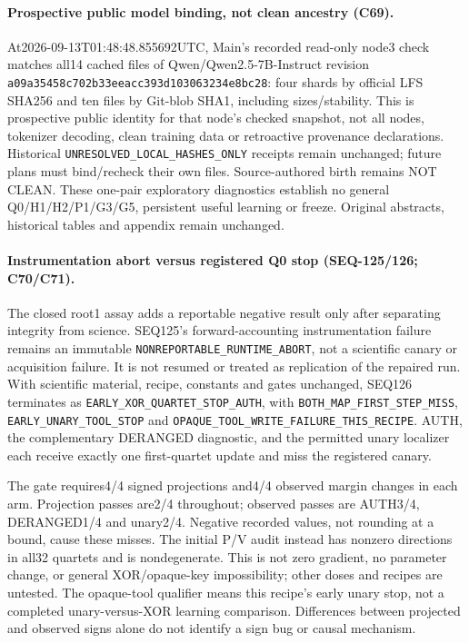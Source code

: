 \documentclass{article}
\begin{document}
\paragraph{Prospective public model binding, not clean ancestry (C69).}
At2026-09-13T01:48:48.855692UTC, Main's recorded read-only node3 check matches
all14 cached files of Qwen/Qwen2.5-7B-Instruct revision
\texttt{a09a35458c702b33eeacc393d103063234e8bc28}: four shards by official
LFS SHA256 and ten files by Git-blob SHA1, including sizes/stability. This is
prospective public identity for that node's checked snapshot, not all nodes,
tokenizer decoding, clean training data or retroactive provenance declarations.
Historical \texttt{UNRESOLVED\_LOCAL\_HASHES\_ONLY} receipts remain unchanged;
future plans must bind/recheck their own files. Source-authored birth remains
NOT CLEAN. These one-pair exploratory diagnostics establish no general
Q0/H1/H2/P1/G3/G5, persistent useful learning or freeze. Original abstracts,
historical tables and appendix remain unchanged.

\paragraph{Instrumentation abort versus registered Q0 stop (SEQ-125/126; C70/C71).}
The closed root1 assay adds a reportable negative result only after separating
integrity from science. SEQ125's forward-accounting instrumentation failure
remains an immutable \texttt{NONREPORTABLE\_RUNTIME\_ABORT}, not a scientific
canary or acquisition failure. It is not resumed or treated as replication of
the repaired run. With scientific material, recipe, constants and gates unchanged,
SEQ126 terminates as \texttt{EARLY\_XOR\_QUARTET\_STOP\_AUTH}, with
\texttt{BOTH\_MAP\_FIRST\_STEP\_MISS},
\texttt{EARLY\_UNARY\_TOOL\_STOP} and
\texttt{OPAQUE\_TOOL\_WRITE\_FAILURE\_THIS\_RECIPE}.
AUTH, the complementary DERANGED diagnostic, and the permitted unary localizer
each receive exactly one first-quartet update and miss the registered canary.

The gate requires4/4 signed projections and4/4 observed margin changes in each
arm. Projection passes are2/4 throughout; observed passes are AUTH3/4,
DERANGED1/4 and unary2/4. Negative recorded values, not rounding at a bound,
cause these misses. The initial P/V audit instead has nonzero directions in
all32 quartets and is nondegenerate. This is not zero gradient, no parameter
change, or general XOR/opaque-key impossibility; other doses and recipes are
untested. The opaque-tool qualifier means this recipe's early unary stop,
not a completed unary-versus-XOR learning comparison. Differences between
projected and observed signs alone do not identify a sign bug or causal mechanism.
\end{document}
